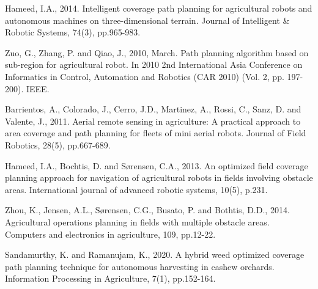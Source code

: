 \begin{thebibliography}{9}
\bibitem
Hameed, I.A., 2014. Intelligent coverage path planning for agricultural robots and autonomous machines on three-dimensional terrain. Journal of Intelligent \& Robotic Systems, 74(3), pp.965-983.

\bibitem
Zuo, G., Zhang, P. and Qiao, J., 2010, March. Path planning algorithm based on sub-region for agricultural robot. In 2010 2nd International Asia Conference on Informatics in Control, Automation and Robotics (CAR 2010) (Vol. 2, pp. 197-200). IEEE.

\bibitem
Barrientos, A., Colorado, J., Cerro, J.D., Martinez, A., Rossi, C., Sanz, D. and Valente, J., 2011. Aerial remote sensing in agriculture: A practical approach to area coverage and path planning for fleets of mini aerial robots. Journal of Field Robotics, 28(5), pp.667-689.

\bibitem
Hameed, I.A., Bochtis, D. and Sørensen, C.A., 2013. An optimized field coverage planning approach for navigation of agricultural robots in fields involving obstacle areas. International journal of advanced robotic systems, 10(5), p.231.

\bibitem
Zhou, K., Jensen, A.L., Sørensen, C.G., Busato, P. and Bothtis, D.D., 2014. Agricultural operations planning in fields with multiple obstacle areas. Computers and electronics in agriculture, 109, pp.12-22.

\bibitem
Sandamurthy, K. and Ramanujam, K., 2020. A hybrid weed optimized coverage path planning technique for autonomous harvesting in cashew orchards. Information Processing in Agriculture, 7(1), pp.152-164.

\end{thebibliography}